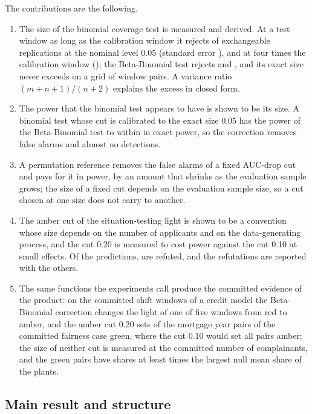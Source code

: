 The contributions are the following.
\begin{enumerate}
\item The size of the binomial coverage test is measured and derived. At a test window as long as the calibration window it rejects \CovSinBinB{} of exchangeable replications at the nominal level 0.05 (standard error \CovSeBinB{}), and at four times the calibration window \CovSinBinC{} (\CovSeBinC{}); the Beta-Binomial test rejects \CovSinBBB{} and \CovSinBBC{}, and its exact size never exceeds \CovBBMaxExact{} on a grid of \CovGridCells{} window pairs. A variance ratio $(m+n+1)/(n+2)$ explains the excess in closed form.
\item The power that the binomial test appears to have is shown to be its size. A binomial test whose cut is calibrated to the exact size 0.05 has the power of the Beta-Binomial test to within \ExPowGapMax{} in exact power, so the correction removes false alarms and almost no detections.
\item A permutation reference removes the false alarms of a fixed AUC-drop cut and pays for it in power, by an amount that shrinks as the evaluation sample grows; the size of a fixed cut depends on the evaluation sample size, so a cut chosen at one size does not carry to another.
\item The amber cut of the situation-testing light is shown to be a convention whose size depends on the number of applicants and on the data-generating process, and the cut 0.20 is measured to cost power against the cut 0.10 at small effects. Of the \HypTotal{} predictions, \HypRefuted{} are refuted, and the refutations are reported with the others.
\item The same functions the experiments call produce the committed evidence of the product: on the committed shift windows of a credit model the Beta-Binomial correction changes the light of one of five windows from red to amber, and the amber cut 0.20 sets \CmFairGreen{} of the \CmFairPairs{} mortgage year pairs of the committed fairness case green, where the cut 0.10 would set all \CmFairAboveTen{} pairs amber; the size of neither cut is measured at the committed number of complainants, and the green pairs have shares at least \CmFairGreenOverNull{} times the largest null mean share of the plants.
\end{enumerate}

\subsection*{Main result and structure}

